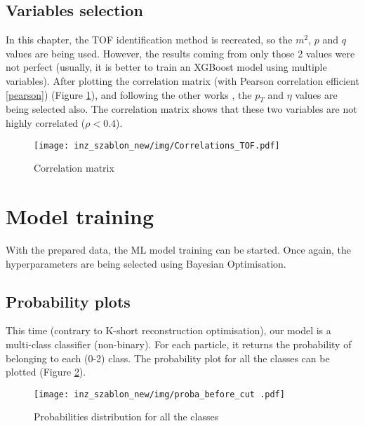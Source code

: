 \subsection{Variables selection}
In this chapter, the TOF identification method is recreated, so the $m^2$, $p$ and $q$ values are being used. However, the results coming from only those 2 values were not perfect (usually, it is better to train an XGBoost model using multiple variables). After plotting the correlation matrix (with Pearson correlation efficient \ref{pearson}) (Figure \ref{cmatrix tof}), and following the other works \cite{ostrowski}, the $p_T$ and $\eta$ values are being selected also. The correlation matrix shows that these two variables are not highly correlated ($\rho < 0.4$). 
\begin{figure}[h!]
    \centering
    \texttt{[image: inz\_szablon\_new/img/Correlations\_TOF.pdf]}
    \caption{Correlation matrix}
    \label{cmatrix tof}
\end{figure}

\section{Model training}
With the prepared data, the ML model training can be started. Once again, the hyperparameters are being selected using Bayesian Optimisation. 

\subsection{Probability plots}
This time (contrary to K-short reconstruction optimisation), our model is a multi-class classifier (non-binary). For each particle, it returns the probability of belonging to each (0-2) class. The probability plot for all the classes can be plotted (Figure \ref{proba all}).
\begin{figure}[H]
    \centering
    \texttt{[image: inz\_szablon\_new/img/proba\_before\_cut .pdf]}
    \caption{Probabilities distribution for all the classes}
    \label{proba all}
\end{figure}

